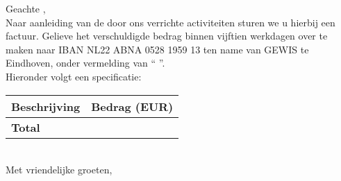 \documentclass[
 digital,         %
]{GEWISLetter}
\newcommand{\GEWIScontact}{%
}
\begin{document}
\GEWISfirstpage                 %
\printadresenkenmerk            %


Geachte %
,\\[2\baselineskip]
Naar aanleiding van de door ons verrichte activiteiten sturen we u hierbij een factuur. Gelieve het verschuldigde bedrag binnen vijftien werkdagen over te maken naar IBAN NL22 ABNA 0528 1959 13 ten name van GEWIS te Eindhoven, onder vermelding van ``%
''.\\[\baselineskip]
Hieronder volgt een specificatie:\\[\baselineskip]
\begin{tabularx}{\textwidth}{X r}\toprule
Beschrijving & Bedrag (EUR)\\\midrule
\cmidrule{2-2} \textbf{Total} & {\bfseries %
}\\\bottomrule
\end{tabularx}
\\[2\baselineskip]
Met vriendelijke groeten,\\[2\baselineskip]
\GEWIScontact
\end{document}
